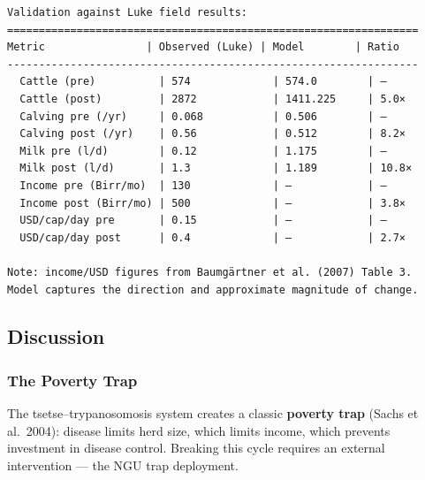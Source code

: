 \begin{verbatim}
Validation against Luke field results:
=================================================================
Metric                | Observed (Luke) | Model        | Ratio
-----------------------------------------------------------------
  Cattle (pre)          | 574             | 574.0        | —
  Cattle (post)         | 2872            | 1411.225     | 5.0×
  Calving pre (/yr)     | 0.068           | 0.506        | —
  Calving post (/yr)    | 0.56            | 0.512        | 8.2×
  Milk pre (l/d)        | 0.12            | 1.175        | —
  Milk post (l/d)       | 1.3             | 1.189        | 10.8×
  Income pre (Birr/mo)  | 130             | —            | —
  Income post (Birr/mo) | 500             | —            | 3.8×
  USD/cap/day pre       | 0.15            | —            | —
  USD/cap/day post      | 0.4             | —            | 2.7×

Note: income/USD figures from Baumgärtner et al. (2007) Table 3.
Model captures the direction and approximate magnitude of change.
\end{verbatim}



\subsection{Discussion}



\label{15635872459172719270}{}


\subsubsection{The Poverty Trap}



\label{6279690425363364362}{}


The tsetse–trypanosomosis system creates a classic \textbf{poverty trap} (Sachs et al.~2004): disease limits herd size, which limits income, which prevents investment in disease control. Breaking this cycle requires an external intervention — the NGU trap deployment.




